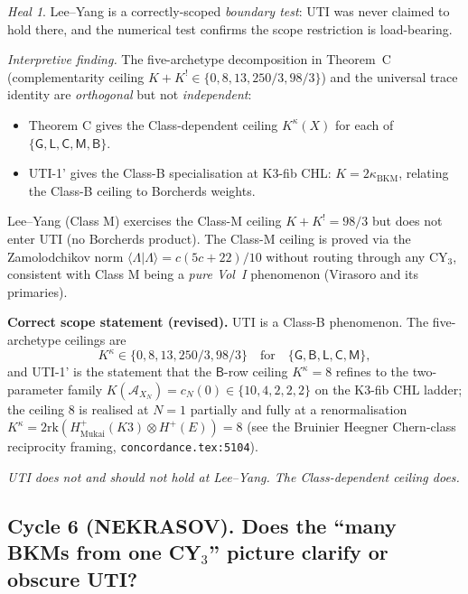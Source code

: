 \documentclass[11pt]{amsart}
\theoremstyle{definition}
\theoremstyle{remark}
\newtheorem{heal}[theorem]{Heal}
\newcommand{\kBKM}{\kappa_{\mathrm{BKM}}}
\begin{document}
\begin{heal}\label{heal:lee-yang-scope-test}
Lee--Yang is a correctly-scoped \emph{boundary test}: UTI was never claimed to hold there, and
the numerical test confirms the scope restriction is load-bearing.

\emph{Interpretive finding.} The five-archetype decomposition in Theorem~C (complementarity
ceiling $K + K^! \in \{0, 8, 13, 250/3, 98/3\}$) and the universal trace identity are
\emph{orthogonal} but not \emph{independent}:
\begin{itemize}
\item Theorem C gives the Class-dependent ceiling $K^\kappa(X)$ for each of
$\{\mathsf{G}, \mathsf{L}, \mathsf{C}, \mathsf{M}, \mathsf{B}\}$.
\item UTI-1' gives the Class-B specialisation at K3-fib CHL: $K = 2 \kBKM$, relating the
Class-B ceiling to Borcherds weights.
\end{itemize}

Lee--Yang (Class M) exercises the Class-M ceiling $K + K^! = 98/3$ but does not enter UTI
(no Borcherds product). The Class-M ceiling is proved via the Zamolodchikov norm
$\langle \Lambda | \Lambda \rangle = c(5c+22)/10$ without routing through any CY$_3$, consistent
with Class M being a \emph{pure Vol~I} phenomenon (Virasoro and its primaries).

\textbf{Correct scope statement (revised).} UTI is a Class-B phenomenon. The five-archetype
ceilings are
\[
K^\kappa \in \{0, 8, 13, 250/3, 98/3\} \quad \text{for} \quad \{\mathsf{G}, \mathsf{B}, \mathsf{L}, \mathsf{C}, \mathsf{M}\},
\]
and UTI-1' is the statement that the $\mathsf{B}$-row ceiling $K^\kappa = 8$ refines to the
two-parameter family $K(\mathcal{A}_{X_N}) = c_N(0) \in \{10, 4, 2, 2, 2\}$ on the K3-fib CHL
ladder; the ceiling $8$ is realised at $N = 1$ partially and fully at a renormalisation
$K^\kappa = 2 \mathrm{rk}(H^+_{\mathrm{Mukai}}(K3) \otimes H^+(E)) = 8$ (see the Bruinier
Heegner Chern-class reciprocity framing, \texttt{concordance.tex:5104}).

\emph{UTI does not and should not hold at Lee--Yang. The Class-dependent ceiling does.}
\end{heal}

\subsection{Cycle 6 (NEKRASOV). Does the ``many BKMs from one CY$_3$'' picture clarify or obscure UTI?}
\end{document}
